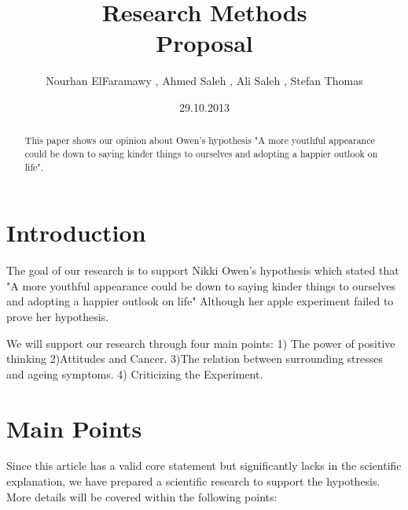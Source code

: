 \documentclass[12pt]{article}
\newcommand{\trauthor}{Nourhan ElFaramawy , Ahmed Saleh , Ali Saleh , Stefan Thomas}
\newcommand{\trtype}{Proposal} %
\newcommand{\trtitle}{Research Methods}
\newcommand{\trdate}{29.10.2013}
\theoremstyle{plain}
\theoremstyle{definition}
\theoremstyle{remark}
\begin{document}
\renewcommand{\headheight}{14.5pt}

\fancyhead{}
\fancyhead[CO]{\trtitle}

\title{\trtitle\\[0.3cm]{\normalsize\trtype}}
\author{\trauthor}
\date{\trdate}
\maketitle


\thispagestyle{empty}

\begin{abstract}
  This paper shows our opinion about Owen's hypothesis "A more youthful appearance could be down to saying kinder things to ourselves and adopting a happier outlook on life".
\end{abstract}


\section{Introduction}
\label{sec:introduction}

The goal of our research is to support Nikki Owen's hypothesis which stated that "A more youthful appearance could be down to saying kinder things to ourselves and adopting a happier outlook on life" Although her apple experiment failed to prove her hypothesis.

We will support our research through four main points: 1) The power of positive thinking    2)Attitudes and Cancer.  3)The relation between surrounding stresses and ageing symptoms. 4) Criticizing the Experiment.

\section{Main Points}
\label{sec:relwork}

Since this article has a valid core statement but significantly lacks in the scientific explanation, we have prepared a scientific research to support the hypothesis. More details will be covered within the following points: 
\end{document}

